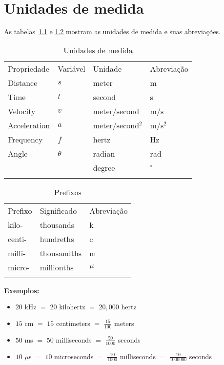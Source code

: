 
\chapter{Unidades de medida}\label{ch.units}

As tabelas~\ref{tab.units} e \ref{tab.prefixes} mostram as unidades de medida e suas abreviações.

\begin{table}
\caption{Unidades de medida}
\label{tab.units}
\begin{tabular}{p{2cm}p{1.5cm}p{2.5cm}p{2cm}}
\hline\noalign{\smallskip}
Propriedade & Variável & Unidade & Abreviação\\
\noalign{\smallskip}\hline\noalign{\smallskip}
Distance & $s$ & meter  & m\\
Time &  $t$ & second & s\\
Velocity & $v$ & meter/second &  m/s\\
Acceleration & $a$ & meter/second$^2$ & m/s$^2$\\
Frequency & $f$ & hertz & Hz\\
Angle & $\theta$ & radian & rad\\
& & degree & $^\circ$\\
\noalign{\smallskip}\hline\noalign{\smallskip}
\end{tabular}
\end{table}

\begin{table}
\caption{Prefixos}
\label{tab.prefixes}
\begin{tabular}{p{1.5cm}p{2.2cm}p{1.7cm}}
\hline\noalign{\smallskip}
Prefixo & Significado & Abreviação \\
\noalign{\smallskip}\hline\noalign{\smallskip}
kilo- & thousands & k\\
centi- & hundreths & c\\
milli- & thousandths & m\\
micro- & millionths & $\mu$\\
\noalign{\smallskip}\hline\noalign{\smallskip}
\end{tabular}
\end{table}

\noindent\textbf{Exemplos:}

\begin{itemize}\setlength{\itemsep}{6pt}
\item $20$ kHz $=$ $20$ kilohertz $=$ $20,000$ hertz
\item $15$ cm $=$ $15$ centimeters $=$ $\frac{15}{100}$ meters
\item $50$ ms $=$ $50$ milliseconds $=$ $\frac{50}{1000}$ seconds
\item $10$ $\mu$s $=$ $10$ microseconds $=$ $\frac{10}{1000}$ milliseconds $=$ $\frac{10}{1000000}$ seconds
\end{itemize}

